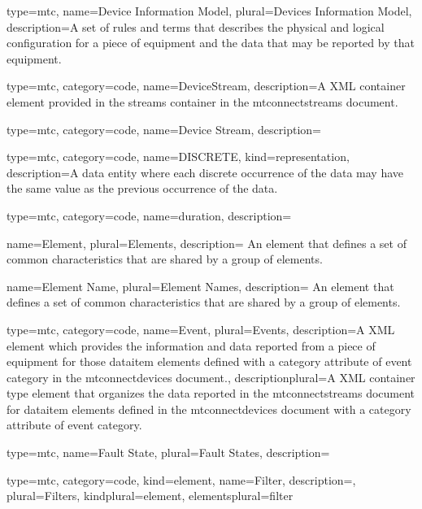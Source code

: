 {
  type=mtc,
  name={Device Information Model},
  plural={Devices Information Model},
  description={A set of rules and terms that describes the physical and logical configuration for a piece of equipment and the data that may be reported by that equipment.}
}


{
  type=mtc,
  category=code,
  name={DeviceStream},
  description={A XML container element provided in the \glspl{stream} container in the \glspl{mtconnectstream} document.}
}


{
  type=mtc,
  category=code,
  name={Device Stream},
  description={}
}


{
  type=mtc,
  category=code,
  name={DISCRETE},
  kind={representation},
  description={A \gls{data entity} where each discrete occurrence of the data may have the same value as the previous occurrence of the data.}
}


{
  type=mtc,
  category=code,
  name={duration},
  description={}
}


{
  name={Element},
  plural={Elements},
  description= {An element that defines a set of common characteristics that are shared by a group of elements.}
}


{
  name={Element Name},
  plural={Element Names},
  description= {An element that defines a set of common characteristics that are shared by a group of elements.}
}


{
  type=mtc,
  category=code,
  name={Event},
  plural={Events},
  description={A XML element which provides the information and data reported from a piece of equipment for those \gls{dataitem} elements defined with a \gls{category} attribute of \gls{event category} in the \glspl{mtconnectdevice} document.},
  descriptionplural={A XML container type element that organizes the data reported in the \glspl{mtconnectstream} document for \gls{dataitem} elements defined in the \glspl{mtconnectdevice} document with a \gls{category} attribute of \gls{event category}.}
}


{
  type=mtc,
  name={Fault State},
  plural={Fault States},
  description={}
}


{
  type=mtc,
  category=code,
  kind={element},
  name={Filter},
  description={},
  plural={Filters},
  kindplural={element},
  elementsplural={\gls{filter}}
}


